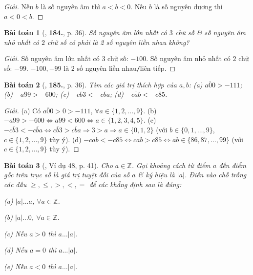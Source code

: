 \documentclass{article}
\numberwithin{equation}{section}
\newtheorem{baitoan}{Bài toán}
\begin{document}
\begin{proof}[Giải]
	Nếu $b$ là số nguyên âm thì $a < b < 0$. Nếu $b$ là số nguyên dương thì $a < 0 < b$.
\end{proof}

\begin{baitoan}[\cite{Tuyen_Toan_6}, \textbf{184.}, p. 36]
	Số nguyên âm lớn nhất có $3$ chữ số \& số nguyên âm nhỏ nhất có $2$ chữ số có phải là 2 số nguyên liền nhau không?
\end{baitoan}

\begin{proof}[Giải]
	Số nguyên âm lớn nhất có $3$ chữ số: $-100$. Số nguyên âm nhỏ nhất có $2$ chữ số: $-99$. $-100,-99$ là 2 số nguyên liền nhau\texttt{/}liên tiếp.
\end{proof}

\begin{baitoan}[\cite{Tuyen_Toan_6}, \textbf{185.}, p. 36]
	Tìm các giá trị thích hợp của $a,b$: (a) $\overline{a00} > -111$; (b) $-\overline{a99} > -600$; (c) $-\overline{cb3} < -\overline{cba}$; (d) $-\overline{cab} < -\overline{c85}$.
\end{baitoan}

\begin{proof}[Giải]
	(a) Có $\overline{a00} > 0 > -111$, $\forall a\in\{1,2,\ldots,9\}$. (b) $-\overline{a99} > -600\Leftrightarrow\overline{a99} < 600\Leftrightarrow a\in\{1,2,3,4,5\}$. (c) $-\overline{cb3} < -\overline{cba}\Leftrightarrow\overline{cb3} > \overline{cba}\Rightarrow 3 > a\Rightarrow a\in\{0,1,2\}$ (với $b\in\{0,1,\ldots,9\}$, $c\in\{1,2,\ldots,9\}$ tùy ý). (d) $-\overline{cab} < -\overline{c85}\Leftrightarrow\overline{cab} > \overline{c85}\Leftrightarrow\overline{ab}\in\{86,87,\ldots,99\}$ (với $c\in\{1,2,\ldots,9\}$ tùy ý).
\end{proof}

\begin{baitoan}[\cite{Binh_Toan_6_tap_1}, Ví dụ 48, p. 41]
	Cho $a\in\mathbb{Z}$. Gọi khoảng cách từ điểm $a$ đến điểm gốc trên trục số là \emph{giá trị tuyệt đối} của số $a$ \& ký hiệu là $|a|$. Điền vào chỗ trống các dấu $\ge,\le,>,<,=$ để các khẳng định sau là đúng:
	\begin{enumerate*}
		\item[(a)] $|a|\ldots a$, $\forall a\in\mathbb{Z}$.
		\item[(b)] $|a|\ldots 0$, $\forall a\in\mathbb{Z}$.
		\item[(c)] Nếu $a > 0$ thì $a\ldots|a|$.
		\item[(d)] Nếu $a = 0$ thì $a\ldots|a|$.
		\item[(e)] Nếu $a < 0$ thì $a\ldots|a|$.
	\end{enumerate*}
\end{baitoan}
\end{document}
